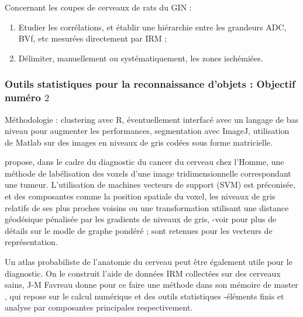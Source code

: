 Concernant les coupes de cerveaux de rats du GIN :

\begin{enumerate}[label=\textbf{(Objectif \ \arabic*)}]
\item Etudier les corr\'elations, et \'etablir une hi\'erarchie entre les grandeurs ADC, BVf, etc mesur\'ees directement par IRM ;
\item D\'elimiter, manuellement ou syst\'ematiquement, les zones isch\'emi\'ees.
\end{enumerate}

\subsubsection{Outils statistiques pour la reconnaissance d'objets : Objectif num\'ero $2$}

M\'ethodologie : clustering avec R, \'eventuellement interfac\'e avec un langage de bas niveau pour augmenter les performances, %
segmentation avec ImageJ, utilisation de Matlab sur des images en niveaux de gris cod\'ees sous forme matricielle.

\etoile
\cite{dol_cmi_16} propose, dans le cadre du diagnostic du cancer du cerveau chez l'Homme, une m\'ethode de lab\'elisation des voxels d'une image tridimensionnelle %
correspondant  une tumeur. %
L'utilisation de machines  vecteurs de support (SVM) est pr\'econis\'ee, et des composantes comme la position spatiale du voxel, %
les niveaux de gris relatifs de ses plus proches voisins ou une transformation utilisant une distance g\'eod\'esique p\'enalis\'ee par les gradients de niveaux de gris, %
-voir \cite{wei_geo_08} pour plus de d\'etails sur le modle de graphe pond\'er\'e ; sont retenues pour les vecteurs de repr\'esentation.

\par
Un atlas probabiliste de l'anatomie du cerveau peut \^etre \'egalement utile pour le diagnostic. On le construit  l'aide de donn\'ees IRM collect\'ees sur des cerveaux sains, %
J-M Favreau donne pour ce faire une m\'ethode dans son m\'emoire de master \cite{fav_iss_05}, qui repose sur le calcul num\'erique et des outils statistiques -\'el\'ements finis et analyse par composantes principales respectivement.
